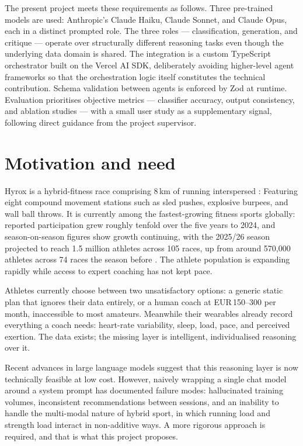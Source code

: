The present project meets these requirements as follows. Three pre-trained models are used: Anthropic's Claude Haiku, Claude Sonnet, and Claude Opus, each in a distinct prompted role. The three roles --- classification, generation, and critique --- operate over structurally different reasoning tasks even though the underlying data domain is shared. The integration is a custom TypeScript orchestrator built on the Vercel AI SDK, deliberately avoiding higher-level agent frameworks so that the orchestration logic itself constitutes the technical contribution. Schema validation between agents is enforced by Zod at runtime. Evaluation prioritises objective metrics --- classifier accuracy, output consistency, and ablation studies --- with a small user study as a supplementary signal, following direct guidance from the project supervisor.

\section{Motivation and need}

Hyrox is a hybrid-fitness race comprising 8\,km of running interspersed : Featuring eight compound movement stations such as sled pushes, explosive burpees, and wall ball throws. It is currently among the fastest-growing fitness sports globally: reported participation grew roughly tenfold over the five years to 2024, and season-on-season figures show growth continuing, with the 2025/26 season projected to reach 1.5 million athletes across 105 races, up from around 570{,}000 athletes across 74 races the season before \cite{hyrox_growth}. The athlete population is expanding rapidly while access to expert coaching has not kept pace.

Athletes currently choose between two unsatisfactory options: a generic static plan that ignores their data entirely, or a human coach at EUR\,150--300 per month, inaccessible to most amateurs. Meanwhile their wearables already record everything a coach needs: heart-rate variability, sleep, load, pace, and perceived exertion. The data exists; the missing layer is intelligent, individualised reasoning over it.

Recent advances in large language models suggest that this reasoning layer is now technically feasible at low cost. However, naively wrapping a single chat model around a system prompt has documented failure modes: hallucinated training volumes, inconsistent recommendations between sessions, and an inability to handle the multi-modal nature of hybrid sport, in which running load and strength load interact in non-additive ways. A more rigorous approach is required, and that is what this project proposes.


